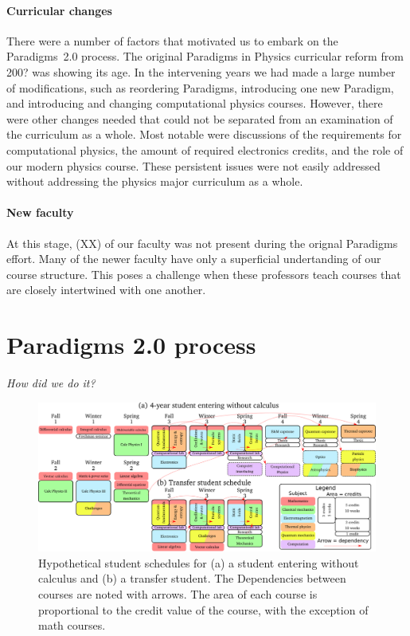 \documentclass[english,aps,pra,reprint,noshowpacs,superscriptaddress]{revtex4-1}
\begin{document}
\paragraph{Curricular changes}
There were a number of factors that motivated us to embark on the
Paradigms~2.0 process.  The original Paradigms in Physics curricular
reform from 200? was showing its age.  In the intervening years we had
made a large number of modifications, such as reordering Paradigms,
introducing one new Paradigm, and introducing and changing
computational physics courses.  However, there were other changes
needed that could not be separated from an examination of the
curriculum as a whole.  Most notable were discussions of the
requirements for computational physics, the amount of required
electronics credits, and the role of our modern physics course.  These
persistent issues were not easily addressed without addressing the
physics major curriculum as a whole.

\paragraph{New faculty}
At this stage, (XX) of our faculty was not present during the orignal
Paradigms effort.  Many of the newer faculty have only a superficial
undertanding of our course structure.  This poses a challenge when
these professors teach courses that are closely intertwined with one
another.

\section{Paradigms 2.0 process}
\emph{How did we do it?}

\newcommand\mathcourse[2]{\emph{#1}}
\newcommand\noted[2]{\textbf{#1} (#2)}
\newcommand\paradigm[1]{{\sc #1} (3)}
\newcommand\capstone[1]{#1 (3)}
\newcommand\onecredit[1]{#1 (1)}
\newcommand\threecredit[1]{#1 (3)}
\newcommand\fourcredit[1]{#1 (4)}

\begin{figure}
\includegraphics[width=\textwidth]{schedule}
\caption{Hypothetical student schedules for (a) a student entering
  without calculus and (b) a transfer student.  The Dependencies
  between courses are noted with arrows.  The area of each course is
  proportional to the credit value of the course, with the exception
  of math courses.\label{schedule}}
\end{figure}
\end{document}

